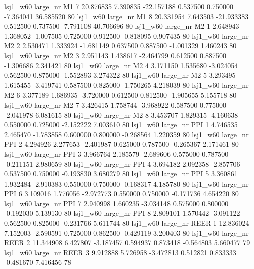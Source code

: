     lsj1_w60   large_nr       M1                 7 20.876835  7.390835 -22.157188 0.537500 0.750000 -7.364041   36.585520 80
    lsj1_w60   large_nr       M1                 8 20.331954  7.643503 -21.933383 0.512500 0.737500 -7.791108   40.706696 80
    lsj1_w60   large_nr       M2                 1  2.648943  1.368052  -1.007505 0.725000 0.912500 -0.818095    0.907435 80
    lsj1_w60   large_nr       M2                 2  2.530471  1.333924  -1.681149 0.637500 0.887500 -1.001329    1.460243 80
    lsj1_w60   large_nr       M2                 3  2.951143  1.438617  -2.464799 0.612500 0.887500 -1.306686    2.341421 80
    lsj1_w60   large_nr       M2                 4  3.171150  1.535680  -3.024054 0.562500 0.875000 -1.552893    3.274322 80
    lsj1_w60   large_nr       M2                 5  3.293495  1.615455  -3.419741 0.587500 0.825000 -1.750265    4.218039 80
    lsj1_w60   large_nr       M2                 6  3.377189  1.686935  -3.720000 0.612500 0.812500 -1.905655    5.155718 80
    lsj1_w60   large_nr       M2                 7  3.426415  1.758744  -3.968922 0.587500 0.775000 -2.041978    6.081615 80
    lsj1_w60   large_nr       M2                 8  3.453707  1.829315  -4.160638 0.550000 0.725000 -2.152222    7.003610 80
    lsj1_w60   large_nr      PPI                 1  4.746535  2.465470  -1.783858 0.600000 0.800000 -0.268564    1.220359 80
    lsj1_w60   large_nr      PPI                 2  4.294926  2.277653  -2.401987 0.625000 0.787500 -0.265367    2.171461 80
    lsj1_w60   large_nr      PPI                 3  3.966764  2.185579  -2.689606 0.575000 0.787500 -0.211151    2.980659 80
    lsj1_w60   large_nr      PPI                 4  3.694182  2.092358  -2.857706 0.537500 0.750000 -0.193830    3.680279 80
    lsj1_w60   large_nr      PPI                 5  3.360861  1.932484  -2.910383 0.550000 0.750000 -0.168317    4.185780 80
    lsj1_w60   large_nr      PPI                 6  3.109016  1.776056  -2.972773 0.550000 0.750000 -0.171736    4.654220 80
    lsj1_w60   large_nr      PPI                 7  2.940998  1.660235  -3.034148 0.575000 0.800000 -0.192030    5.139130 80
    lsj1_w60   large_nr      PPI                 8  2.809101  1.570442  -3.091122 0.562500 0.825000 -0.231766    5.611744 80
    lsj1_w60   large_nr     REER                 1 12.836024  7.152003  -2.590591 0.725000 0.862500 -0.429119    3.200403 80
    lsj1_w60   large_nr     REER                 2 11.344908  6.427807  -3.187457 0.594937 0.873418 -0.564803    5.660477 79
    lsj1_w60   large_nr     REER                 3  9.912888  5.726958  -3.472813 0.512821 0.833333 -0.481670    7.416456 78
